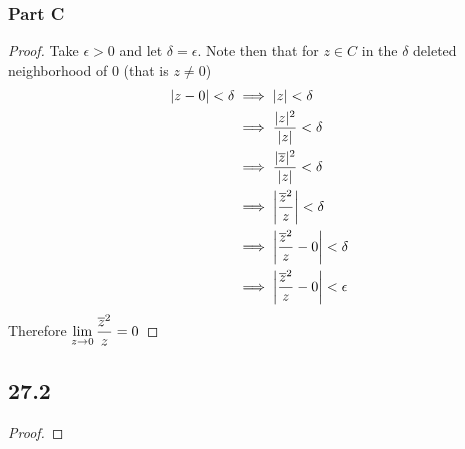 \documentclass[12pt,titlepage]{extarticle}
\begin{document}
\subsubsection*{Part C}
\begin{proof}
    Take $\epsilon > 0$ and let $\delta = \epsilon$. Note then that for $z \in C$ in the $\delta$ deleted neighborhood of $0$ (that is $z \neq 0$)
    \begin{align*}
        |z - 0| < \delta &\implies |z| < \delta \\
                      &\implies \frac{|z|^2}{|z|} < \delta \\ 
                      &\implies \frac{|\overline{z}|^2}{|z|} < \delta \\
                      &\implies \qty|\frac{\overline{z}^2}{z}| < \delta \\
                      &\implies \qty|\frac{\overline{z}^2}{z} - 0| < \delta \\
                      &\implies \qty|\frac{\overline{z}^2}{z} - 0| < \epsilon
    \end{align*}
    Therefore $\displaystyle\lim_{z \to 0} \frac{\overline{z}^2}{z} = 0$
\end{proof}

\subsection*{27.2}

\begin{proof}
    
\end{proof}
\end{document}
